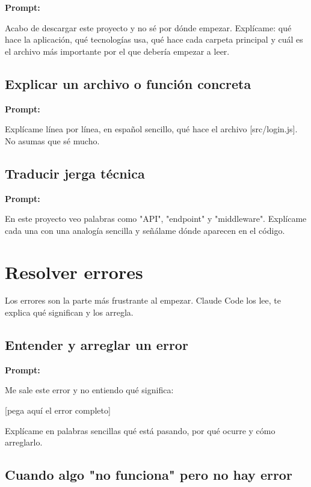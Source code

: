 \documentclass[11pt,a4paper]{report}
\begin{document}
\noindent\textbf{Prompt: }
\begin{codebox}
Acabo de descargar este proyecto y no sé por dónde empezar. Explícame: qué hace la aplicación, qué tecnologías usa, qué hace cada carpeta principal y cuál es el archivo más importante por el que debería empezar a leer.
\end{codebox}

\subsection{Explicar un archivo o función concreta}

\noindent\textbf{Prompt: }
\begin{codebox}
Explícame línea por línea, en español sencillo, qué hace el archivo [src/login.js]. No asumas que sé mucho.
\end{codebox}

\subsection{Traducir jerga técnica}

\noindent\textbf{Prompt: }
\begin{codebox}
En este proyecto veo palabras como "API", "endpoint" y "middleware". Explícame cada una con una analogía sencilla y señálame dónde aparecen en el código.
\end{codebox}

\section{ Resolver errores}

Los errores son la parte más frustrante al empezar. Claude Code los lee, te explica qué significan y los arregla.

\subsection{Entender y arreglar un error}

\noindent\textbf{Prompt: }
\begin{codebox}
Me sale este error y no entiendo qué significa:

[pega aquí el error completo]

Explícame en palabras sencillas qué está pasando, por qué ocurre y cómo arreglarlo.
\end{codebox}

\subsection{Cuando algo "no funciona" pero no hay error}
\end{document}

